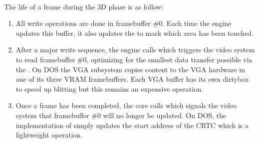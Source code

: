 \par
 \\
\par
\vspace{5pt}
\pagebreak
\par
The life of a frame during the 3D phase is as follow:
\begin{enumerate}
\item All write operations are done in framebuffer \#0. Each time the engine updates this buffer, it also updates the  to mark which area has been touched.
\item After a major write sequence, the engine calls  which triggers the video system to read framebuffer \#0, optimizing for the smallest data transfer possible via the . On DOS the VGA subsystem copies content to the VGA hardware in one of its three VRAM framebuffers. Each VGA buffer has its own dirtybox  to speed up blitting but this remains an expensive operation.

\item Once a frame has been completed, the core calls   which signals the video system that framebuffer \#0 will no longer be updated. On DOS, the implementation of  simply updates the start address of the CRTC which is a lightweight operation.
\end{enumerate}
\par
{}\\
